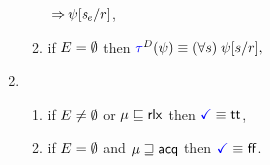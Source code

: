 \begin{multicols}{2}
\begin{enumerate}[topsep=0pt,label=(\textsc{r}\arabic*),ref=\textsc{r}\arabic*]
\begin{enumerate}[leftmargin=0pt]
{\begin{math}
{          }
          \mathbin{\Rightarrow}
          \psi[\mathit{s}_{e}/r]
        \end{math},}
      \columnbreak
    \item \label{read-tau-empty-addr}
      if $E=\emptyset$ then 
      \begin{math}
        \aTr{\bEvs}{\bForm} \riff 
        (\forall\bReg)\;
        \bForm[\bReg/\aReg],
      \end{math}  
    \end{enumerate}  
  \item[] 
    \begin{enumerate}[leftmargin=0pt]
    \item \label{read-term-nonempty-addr}
      if $E\neq\emptyset$ or $\mu\sqsubseteq{\mathsf{rlx}}$ then $\aTerm \riff \TRUE$,
    \item \label{read-term-empty-addr}
      if $E=\emptyset$ and $\mu\sqsupseteq{\mathsf{acq}}$ then $\aTerm \riff \FALSE$. 
    \end{enumerate}      
  \end{enumerate}
\end{multicols}
